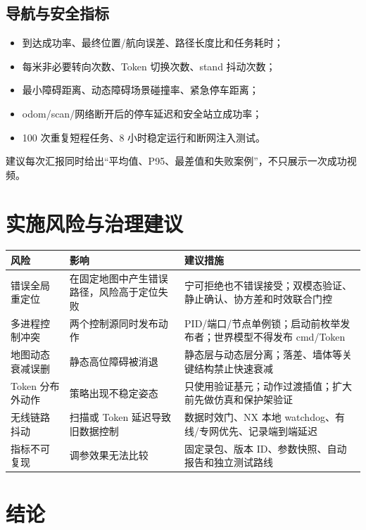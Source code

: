\documentclass[11pt,a4paper,fontset=none]{ctexart}
\begin{document}
\subsection{导航与安全指标}

\begin{itemize}
  \item 到达成功率、最终位置/航向误差、路径长度比和任务耗时；
  \item 每米非必要转向次数、Token 切换次数、stand 抖动次数；
  \item 最小障碍距离、动态障碍场景碰撞率、紧急停车距离；
  \item odom/scan/网络断开后的停车延迟和安全站立成功率；
  \item 100 次重复短程任务、8 小时稳定运行和断网注入测试。
\end{itemize}

建议每次汇报同时给出“平均值、P95、最差值和失败案例”，不只展示一次成功视频。

\section{实施风险与治理建议}

\begin{tabularx}{\textwidth}{p{2.5cm} X X}
\toprule
风险 & 影响 & 建议措施 \\
\midrule
错误全局重定位 & 在固定地图中产生错误路径，风险高于定位失败 & 宁可拒绝也不错误接受；双模态验证、静止确认、协方差和时效联合门控 \\
多进程控制冲突 & 两个控制源同时发布动作 & PID/端口/节点单例锁；启动前枚举发布者；世界模型不得发布 cmd/Token \\
地图动态衰减误删 & 静态高位障碍被消退 & 静态层与动态层分离；落差、墙体等关键结构禁止快速衰减 \\
Token 分布外动作 & 策略出现不稳定姿态 & 只使用验证基元；动作过渡插值；扩大前先做仿真和保护架验证 \\
无线链路抖动 & 扫描或 Token 延迟导致旧数据控制 & 数据时效门、NX 本地 watchdog、有线/专网优先、记录端到端延迟 \\
指标不可复现 & 调参效果无法比较 & 固定录包、版本 ID、参数快照、自动报告和独立测试路线 \\
\bottomrule
\end{tabularx}

\section{结论}
\end{document}
